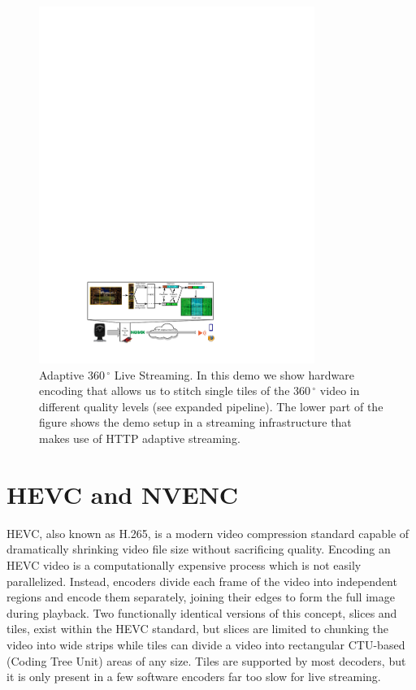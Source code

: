 \renewcommand{\figurename}{Fig.}
\begin{figure}[t]
	\centering
	\includegraphics[width=0.8\textwidth]{figures/Streaming_scenario_v3.pdf}
	\caption{Adaptive $360\,^{\circ}$ Live Streaming. In this demo we show hardware encoding that allows us to stitch single tiles of the $360\,^{\circ}$ video in different quality levels (see expanded pipeline). The lower part of the figure shows the demo setup in a streaming infrastructure that makes use of HTTP adaptive streaming.}
	\label{fig:pipeline}
\end{figure}

\section{HEVC and NVENC} \label{hevc}

HEVC, also known as H.265, is a modern video compression standard capable of dramatically shrinking video file size without sacrificing quality. Encoding an HEVC video is a computationally expensive process which is not easily parallelized. Instead, encoders divide each frame of the video into independent regions and encode them separately, joining their edges to form the full image during playback. Two functionally identical versions of this concept, slices and tiles, exist within the HEVC standard, but slices are limited to chunking the video into wide strips while tiles can divide a video into rectangular CTU-based (Coding Tree Unit) areas of any size. Tiles are supported by most decoders, but it is only present in a few software encoders far too slow for live streaming.

